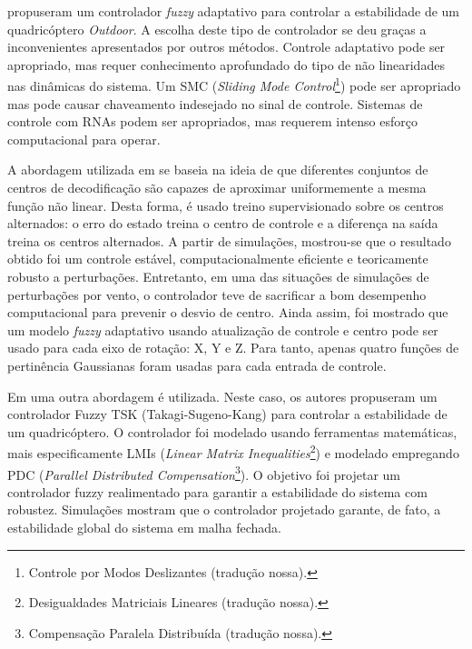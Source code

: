  propuseram um controlador \textit{fuzzy} adaptativo para controlar a estabilidade de um quadricóptero \textit{Outdoor}. A escolha deste tipo de controlador se deu graças a inconvenientes apresentados por outros métodos. Controle adaptativo pode ser apropriado, mas requer conhecimento aprofundado do tipo de não linearidades nas dinâmicas do sistema. Um SMC (\textit{Sliding Mode Control}\footnote{Controle por Modos Deslizantes (tradução nossa).}) pode ser apropriado mas pode causar chaveamento indesejado no sinal de controle. Sistemas de controle com RNAs podem ser apropriados, mas requerem intenso esforço computacional para operar.

A abordagem utilizada em \cite{Coza2006} se baseia na ideia de que diferentes conjuntos de centros de decodificação são capazes de aproximar uniformemente a mesma função não linear. Desta forma, é usado treino supervisionado sobre os centros alternados: o erro do estado treina o centro de controle e a diferença na saída treina os centros alternados. A partir de simulações, mostrou-se que o resultado obtido foi um controle estável, computacionalmente eficiente e teoricamente robusto a perturbações. Entretanto, em uma das situações de simulações de perturbações por vento, o controlador teve de sacrificar a bom desempenho computacional para prevenir o desvio de centro. Ainda assim, foi mostrado que um modelo \textit{fuzzy} adaptativo usando atualização de controle e centro pode ser usado para cada eixo de rotação: X, Y e Z. Para tanto, apenas quatro funções de pertinência Gaussianas foram usadas para cada entrada de controle.

Em \cite{Rabhi2011} uma outra abordagem é utilizada. Neste caso, os autores propuseram um controlador Fuzzy TSK (Takagi-Sugeno-Kang) para controlar a estabilidade de um quadricóptero. O controlador foi modelado usando ferramentas matemáticas, mais especificamente LMIs (\textit{Linear Matrix Inequalities}\footnote{Desigualdades Matriciais Lineares (tradução nossa).}) e modelado empregando PDC (\textit{Parallel Distributed Compensation}\footnote{Compensação Paralela Distribuída (tradução nossa).}). O objetivo foi projetar um controlador fuzzy realimentado para garantir a estabilidade do sistema com robustez. Simulações mostram que o controlador projetado garante, de fato, a estabilidade global do sistema em malha fechada.

